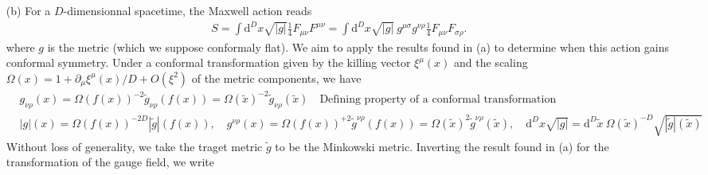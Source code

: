 \documentclass[10pt, a4paper]{article}
\begin{document}
{\begin{enumerate}
\begin{align*}
    &= F_{\mu \nu}(\tilde{x}) - F_{\mu \nu}(\tilde{x}) \frac{\Delta}{D}\partial_\lambda \xi^\lambda(\tilde{x}) - A_{(\nu}(\tilde{x}) \frac{\Delta}{D}\partial_{\mu)} \partial_\lambda \xi^\lambda(\tilde{x})  - (\partial_{(\mu} A_\lambda(\tilde{x}))M_{\nu)}{}^{\lambda} - \xi^{\lambda}(\tilde{x}) \partial_\lambda F_{\mu\nu}(\tilde{x}) - 2(\partial_{(\mu} \xi^{\lambda}(\tilde{x})) \partial_\lambda A_{\nu)}(\tilde{x})
  \end{align*}
  where we simplified further by expliciting 
  \begin{align*}
    & 2\partial_{(\mu} M_{\nu)}{}^{\lambda} = \partial_\mu\partial_\nu \xi^\lambda(\tilde{x}) - \partial_\mu\partial^\lambda \xi_\nu(\tilde{x}) - \partial_\nu \partial_\mu \xi^\lambda(\tilde{x}) - \partial_\nu \partial^\lambda \xi_\mu(\tilde{x}) = 0.
  \end{align*}
  We note that the transformation law of $F_{\mu\nu}$ involves $A_{\mu}$ homogeneously which is an example of mixing of CFT fields under the transformation of a descendant. 
  \item[(b)] For a $D$-dimensionnal spacetime, the Maxwell action reads 
  \begin{align*}
    S = \int \text{d}^D x \sqrt{|g|} \frac{1}{4} F_{\mu\nu} F^{\mu \nu} = \int \text{d}^D x \sqrt{|g|} \ g^{\mu \sigma} g^{\nu \rho}\frac{1}{4} F_{\mu\nu} F_{\sigma \rho}.  
  \end{align*}
  where $g$ is the metric (which we suppose conformaly flat). We aim to apply the results found in (a) to determine when this action gains conformal symmetry. Under a conformal transformation given by the killing vector $\xi^{\mu}(x)$ and the scaling $\Omega(x) = 1 + \partial_\mu \xi^\mu(x)/D + O(\xi^2)$ of the metric components, we have 
  \begin{align*}
    &g_{\nu \rho}(x) = \Omega(f(x))^{-2} \tilde{g}_{\nu \rho}(f(x)) = \Omega(\tilde{x})^{-2} \tilde{g}_{\nu \rho}(\tilde{x}) \quad \text{Defining property of a conformal transformation}\\
    &|g|(x) = \Omega(f(x))^{-2D} |\tilde{g}|(f(x)), \quad g^{\nu \rho}(x) = \Omega(f(x))^{+2} \tilde{g}^{\nu \rho}(f(x)) = \Omega(\tilde{x})^{2} \tilde{g}^{\nu \rho}(\tilde{x}), \quad  \text{d}^D x \sqrt{|g|} = \text{d}^D \tilde{x}\ \Omega(\tilde{x})^{-D} \sqrt{|\tilde{g}|(\tilde{x})}
  \end{align*}
  Without loss of generality, we take the traget metric $\tilde{g}$ to be the Minkowski metric.
  Inverting the result found in (a) for the transformation of the gauge field, we write 

\end{enumerate}}
\end{document}
